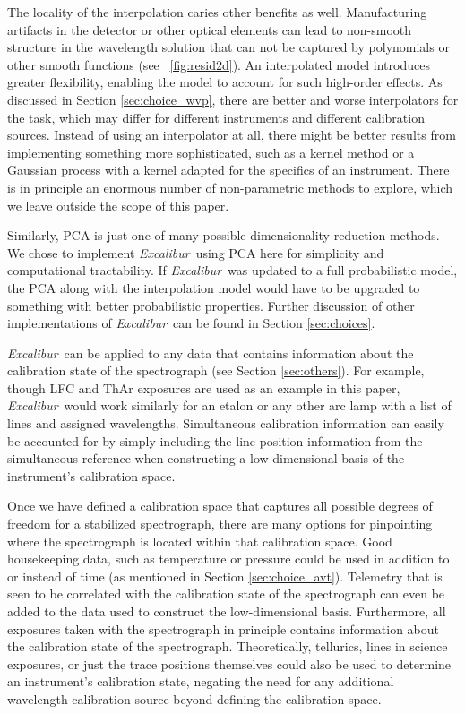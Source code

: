\documentclass[modern]{aastex63}
\newcommand{\project}[1]{\textsl{#1}}
\newcommand{\name}{\project{Excalibur}}
\begin{document}
The locality of the interpolation caries other benefits as well.  Manufacturing artifacts in the detector or other optical elements can lead to non-smooth structure in the wavelength solution that can not be captured by polynomials or other smooth functions (see \figurename~\ref{fig:resid2d}).  An interpolated model introduces greater flexibility, enabling the model to account for such high-order effects.  As discussed in Section \ref{sec:choice_wvp}, there are better and worse interpolators for the task, which may differ for different instruments and different calibration sources.  Instead of using an interpolator at all, there might be better results from implementing something more sophisticated, such as a kernel method or a Gaussian process with a kernel adapted for the specifics of an instrument.  There is in principle an enormous number of non-parametric methods to explore, which we leave outside the scope of this paper.

Similarly, PCA is just one of many possible dimensionality-reduction methods.  We chose to implement \name\ using PCA here for simplicity and computational tractability.  If \name\ was updated to a full probabilistic model, the PCA along with the interpolation model would have to be upgraded to something with better probabilistic properties.  Further discussion of other implementations of \name\ can be found in Section \ref{sec:choices}.

\name\ can be applied to any data that contains information about the calibration state of the spectrograph (see Section \ref{sec:others}).  For example, though LFC and ThAr exposures are used as an example in this paper, \name\ would work similarly for an etalon or any other arc lamp with a list of lines and assigned wavelengths.  Simultaneous calibration information can easily be accounted for by simply including the line position information from the simultaneous reference when constructing a low-dimensional basis of the instrument's calibration space.

Once we have defined a calibration space that captures all possible degrees of freedom for a stabilized spectrograph, there are many options for pinpointing where the spectrograph is located within that calibration space.  Good housekeeping data, such as temperature or pressure could be used in addition to or instead of time (as mentioned in Section \ref{sec:choice_avt}).  Telemetry that is seen to be correlated with the calibration state of the spectrograph can even be added to the data used to construct the low-dimensional basis.  Furthermore, all exposures taken with the spectrograph in principle contains information about the calibration state of the spectrograph.  Theoretically, tellurics, lines in science exposures, or just the trace positions themselves could also be used to determine an instrument's calibration state, negating the need for any additional wavelength-calibration source beyond defining the calibration space.
\end{document}
